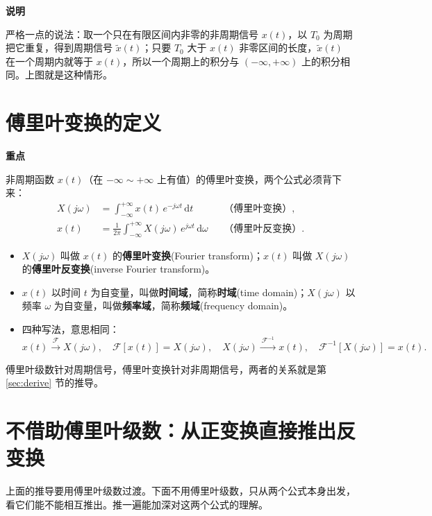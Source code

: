 \documentclass[UTF8,a4paper,11pt]{ctexart}
\newcommand{\dd}{\mathrm{d}}
\newcommand{\F}{\mathcal{F}}
\newenvironment{remember}{\begin{rememberbox}\textbf{重点}\par\smallskip}{\end{rememberbox}}
\newenvironment{note}{\begin{notebox}\textbf{说明}\par\smallskip}{\end{notebox}}
\newcounter{ex}[section]
\begin{document}
\begin{note}
严格一点的说法：取一个只在有限区间内非零的非周期信号 $x(t)$，以 $T_0$ 为周期把它重复，得到周期信号 $\tilde x(t)$；只要 $T_0$ 大于 $x(t)$ 非零区间的长度，$\tilde x(t)$ 在一个周期内就等于 $x(t)$，所以一个周期上的积分与 $(-\infty,+\infty)$ 上的积分相同。上图就是这种情形。
\end{note}

\section{傅里叶变换的定义}\label{sec:def}
\begin{remember}
非周期函数 $x(t)$（在 $-\infty\sim+\infty$ 上有值）的傅里叶变换，两个公式必须背下来：
\[
\begin{aligned}
X(j\omega)&=\int_{-\infty}^{+\infty}x(t)\,e^{-j\omega t}\,\dd t &&\text{（傅里叶变换）},\\
x(t)&=\frac1{2\pi}\int_{-\infty}^{+\infty}X(j\omega)\,e^{j\omega t}\,\dd\omega &&\text{（傅里叶反变换）}.
\end{aligned}
\]
\begin{itemize}[nosep]
\item $X(j\omega)$ 叫做 $x(t)$ 的\textbf{傅里叶变换}(Fourier transform)；$x(t)$ 叫做 $X(j\omega)$ 的\textbf{傅里叶反变换}(inverse Fourier transform)。
\item $x(t)$ 以时间 $t$ 为自变量，叫做\textbf{时间域}，简称\textbf{时域}(time domain)；$X(j\omega)$ 以频率 $\omega$ 为自变量，叫做\textbf{频率域}，简称\textbf{频域}(frequency domain)。
\item 四种写法，意思相同：
\[
x(t)\xrightarrow{\ \F\ }X(j\omega),\quad \F[x(t)]=X(j\omega),\quad
X(j\omega)\xrightarrow{\ \F^{-1}\ }x(t),\quad \F^{-1}[X(j\omega)]=x(t).
\]
\end{itemize}
\end{remember}

傅里叶级数针对周期信号，傅里叶变换针对非周期信号，两者的关系就是第 \ref{sec:derive} 节的推导。

\section{不借助傅里叶级数：从正变换直接推出反变换}\label{sec:proof}
上面的推导要用傅里叶级数过渡。下面不用傅里叶级数，只从两个公式本身出发，看它们能不能相互推出。推一遍能加深对这两个公式的理解。
\end{document}
